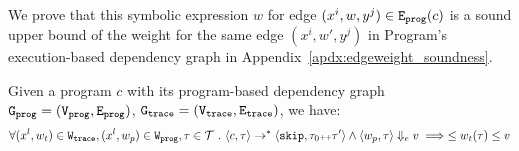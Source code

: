%
We prove that this 
symbolic expression $w$ for edge $(x^i, w, y^j) \in \mathtt{{E_{prog}}}(c)$
 is a sound upper bound of 
the weight for the same edge $(x^i, w', y^j)$ in Program's execution-based dependency graph in Appendix~\ref{apdx:edgeweight_soundness}.
%
\begin{thm}
  \label{thm:edgeweight_soundness}
Given a program ${c}$ with its program-based dependency graph 
$\mathtt{{G_{prog}}} = (\mathtt{{V_{prog}}}, \mathtt{{E_{prog}}})$,
$\mathtt{{G_{trace}}} = (\mathtt{{V_{trace}}}, \mathtt{{E_{trace}}})$, we have:
%
\[
\forall (x^l, w_{t}) \in \mathtt{{W_{trace}}},
(x^l, w_{p}) \in \mathtt{{W_{prog}}}, \mathtt{\tau} \in \mathcal{T} ~.~
\langle {c}, \mathtt{\tau} \rangle \to^{*} \langle \mathtt{skip}, \mathtt{\tau}_0 {\scriptscriptstyle ++} \mathtt{\tau}' \rangle 
\land 
\langle w_{p}, \mathtt{\tau} \rangle \Downarrow_e v
\implies
\leq 
w_{t}(\mathtt{\tau}) \leq v
\]
\end{thm}


